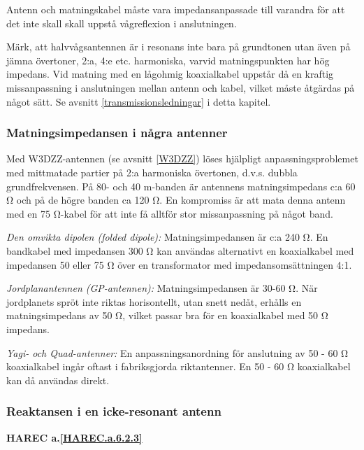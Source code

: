 Antenn och matningskabel måste vara impedansanpassade till varandra
för att det inte skall skall uppstå vågreflexion i anslutningen.

Märk, att halvvågsantennen är i resonans inte bara på grundtonen utan
även på jämna övertoner, 2:a, 4:e etc. harmoniska, varvid
matningspunkten har hög impedans.  Vid matning med en lågohmig
koaxialkabel uppstår då en kraftig missanpassning i anslutningen
mellan antenn och kabel, vilket måste åtgärdas på något sätt. Se
avsnitt \ref{transmissionsledningar} i detta kapitel.

\subsubsection{Matningsimpedansen i några antenner}

Med W3DZZ-antennen (se avsnitt \ref{W3DZZ}) löses hjälpligt anpassningsproblemet med
mittmatade partier på 2:a harmoniska övertonen, d.v.s. dubbla
grundfrekvensen. På 80- och 40 m-banden är antennens matningsimpedans
c:a 60 Ω och på de högre banden ca 120 Ω. En kompromiss är att mata
denna antenn med en 75 Ω-kabel för att inte få alltför stor
missanpassning på något band.

\emph{Den omvikta dipolen (folded dipole):}
Matningsimpedansen är c:a 240 Ω. En bandkabel med impedansen 300 Ω kan
användas alternativt en koaxialkabel med impedansen 50 eller 75 Ω över
en transformator med impedansomsättningen 4:1.

\emph{Jordplanantennen (GP-antennen):} Matningsimpedansen är 30-60
Ω. När jordplanets spröt inte riktas horisontellt, utan snett nedåt,
erhålls en matningsimpedans av 50 Ω, vilket passar bra för en
koaxialkabel med 50 Ω impedans.

\emph{Yagi- och Quad-antenner:} En anpassningsanordning för anslutning
av 50 - 60 Ω koaxialkabel ingår oftast i fabriksgjorda
riktantenner. En 50 - 60 Ω koaxialkabel kan då användas direkt.

\subsubsection{Reaktansen i en icke-resonant antenn}
\textbf{
HAREC a.\ref{HAREC.a.6.2.3}\label{myHAREC.a.6.2.3}
}

